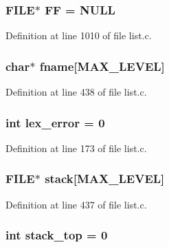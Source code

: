 \subsubsection{\setlength{\rightskip}{0pt plus 5cm}FILE$\ast$ \bf{FF} = NULL\hspace{0.3cm}{\tt  [static]}}\label{list_8c_8d300a1bc2030270e6d8c8d7223b708c}




Definition at line 1010 of file list.c.
\subsubsection{\setlength{\rightskip}{0pt plus 5cm}char$\ast$ \bf{fname}[MAX\_\-LEVEL]\hspace{0.3cm}{\tt  [static]}}\label{list_8c_57ef393a21195639a311f07a06a25cde}




Definition at line 438 of file list.c.
\subsubsection{\setlength{\rightskip}{0pt plus 5cm}int \bf{lex\_\-error} = 0\hspace{0.3cm}{\tt  [static]}}\label{list_8c_814c1953c80a71fb62fbc43f524d6914}




Definition at line 173 of file list.c.
\subsubsection{\setlength{\rightskip}{0pt plus 5cm}FILE$\ast$ \bf{stack}[MAX\_\-LEVEL]\hspace{0.3cm}{\tt  [static]}}\label{list_8c_ec647b16f5623906de8a6cef44727e7f}




Definition at line 437 of file list.c.
\subsubsection{\setlength{\rightskip}{0pt plus 5cm}int \bf{stack\_\-top} = 0\hspace{0.3cm}{\tt  [static]}}\label{list_8c_93e250e5a47f250cbd802e9e7e3c8d2e}




